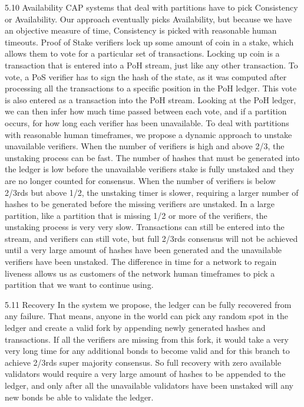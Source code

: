 \documentclass[11pt]{article}
\begin{document}
5.10 Availability CAP systems that deal with partitions have to pick Consistency or Availability. Our approach eventually picks Availability, but because we have an objective measure of time, Consistency is picked with reasonable human timeouts. Proof of Stake verifiers lock up some amount of coin in a stake, which allows them to vote for a particular set of transactions. Locking up coin is a transaction that is entered into a PoH stream, just like any other transaction. To vote, a PoS verifier has to sign the hash of the state, as it was computed after processing all the transactions to a specific position in the PoH ledger. This vote is also entered as a transaction into the PoH stream. Looking at the PoH ledger, we can then infer how much time passed between each vote, and if a partition occurs, for how long each verifier has been unavailable. To deal with partitions with reasonable human timeframes, we propose a dynamic approach to unstake unavailable verifiers. When the number of verifiers is high and above 2/3, the unstaking process can be fast. The number of hashes that must be generated into the ledger is low before the unavailable verifiers stake is fully unstaked and they are no longer counted for consensus. When the number of verifiers is below 2/3rds but above 1/2, the unstaking timer is slower, requiring a larger number of hashes to be generated before the missing verifiers are unstaked. In a large partition, like a partition that is missing 1/2 or more of the verifiers, the unstaking process is very very slow. Transactions can still be entered into the stream, and verifiers can still vote, but full 2/3rds consensus will not be achieved until a very large amount of hashes have been generated and the unavailable verifiers have been unstaked. The difference in time for a network to regain liveness allows us as customers of the network human timeframes to pick a partition that we want to continue using.


5.11 Recovery In the system we propose, the ledger can be fully recovered from any failure. That means, anyone in the world can pick any random spot in the ledger and create a valid fork by appending newly generated hashes and transactions. If all the verifiers are missing from this fork, it would take a very very long time for any additional bonds to become valid and for this branch to achieve 2/3rds super majority consensus. So full recovery with zero available validators would require a very large amount of hashes to be appended to the ledger, and only after all the unavailable validators have been unstaked will any new bonds be able to validate the ledger.
\end{document}
